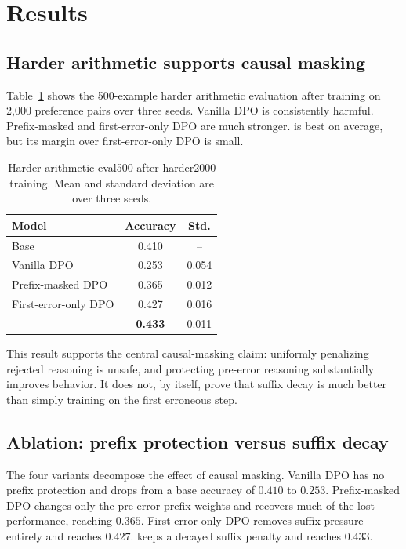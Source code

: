 \section{Results}

\subsection{Harder arithmetic supports causal masking}

Table~\ref{tab:harder-multiseed} shows the 500-example harder arithmetic evaluation after training on 2,000 preference pairs over three seeds. Vanilla DPO is consistently harmful. Prefix-masked and first-error-only DPO are much stronger. \cmdpo{} is best on average, but its margin over first-error-only DPO is small.

\begin{table}[t]
\caption{Harder arithmetic eval500 after harder2000 training. Mean and standard deviation are over three seeds.}
\label{tab:harder-multiseed}
\begin{center}
\begin{tabular}{lcc}
\toprule
Model & Accuracy & Std. \\
\midrule
Base & 0.410 & -- \\
Vanilla DPO & 0.253 & 0.054 \\
Prefix-masked DPO & 0.365 & 0.012 \\
First-error-only DPO & 0.427 & 0.016 \\
\cmdpo{} & \textbf{0.433} & 0.011 \\
\bottomrule
\end{tabular}
\end{center}
\end{table}

This result supports the central causal-masking claim: uniformly penalizing rejected reasoning is unsafe, and protecting pre-error reasoning substantially improves behavior. It does not, by itself, prove that suffix decay is much better than simply training on the first erroneous step.

\subsection{Ablation: prefix protection versus suffix decay}

The four variants decompose the effect of causal masking. Vanilla DPO has no prefix protection and drops from a base accuracy of $0.410$ to $0.253$. Prefix-masked DPO changes only the pre-error prefix weights and recovers much of the lost performance, reaching $0.365$. First-error-only DPO removes suffix pressure entirely and reaches $0.427$. \cmdpo{} keeps a decayed suffix penalty and reaches $0.433$.

